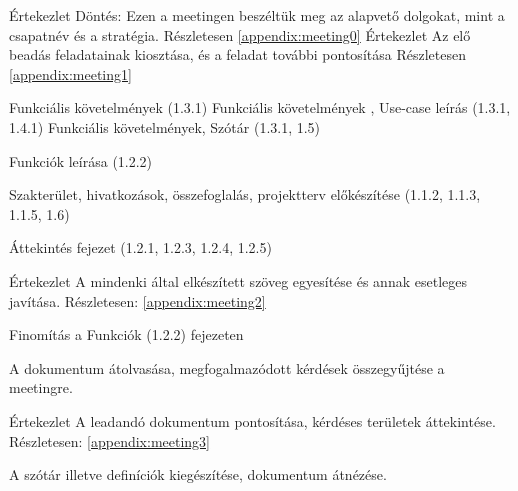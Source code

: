 \documentclass[../../projlab]{subfiles}
\begin{document}
\begin{naplo}
	{ Értekezlet
		\newline Döntés: Ezen a meetingen beszéltük meg az alapvető dolgokat, mint a csapatnév és a stratégia.
		Részletesen \ref{appendix:meeting0}
	}
	{ Értekezlet
		\newline Az elő beadás feladatainak kiosztása, és a feladat további pontosítása
		Részletesen \ref{appendix:meeting1}
	}


	{ 
		Funkciális követelmények (1.3.1)
	}
	{ 
		Funkciális követelmények , Use-case leírás (1.3.1, 1.4.1)
	}
	{ 
		Funkciális követelmények, Szótár (1.3.1, 1.5)
	}



	{ 
		Funkciók leírása (1.2.2)
	}

	{ 
		Szakterület, hivatkozások, összefoglalás, projektterv előkészítése (1.1.2, 1.1.3, 1.1.5, 1.6)
	}

	{ 
		Áttekintés fejezet  (1.2.1, 1.2.3, 1.2.4, 1.2.5)
	}

	{ 
		Értekezlet
		\newline A mindenki által elkészített szöveg egyesítése és annak esetleges javítása.
		\newline
		Részletesen: \ref{appendix:meeting2}
	}
	
	{ 
		Finomítás a Funkciók (1.2.2) fejezeten
	}
	
	{ 
		A dokumentum átolvasása, megfogalmazódott kérdések összegyűjtése a meetingre.
	}

	{ 
		Értekezlet \newline 
		A leadandó dokumentum pontosítása, kérdéses területek áttekintése.
		\newline
		Részletesen: \ref{appendix:meeting3}
	}
	
	{ 
		A szótár illetve definíciók kiegészítése, dokumentum átnézése. 
	}

	

\end{naplo}

\begin{toappendix}



\end{toappendix}
\end{document}
